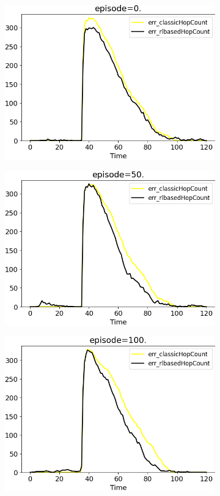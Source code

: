 \documentclass[
  twocolumn,
]{ceurart}
\begin{document}
\begin{figure}
  \centering
  \begin{subfigure}[b]{0.3\textwidth}
      \centering
      \includegraphics[width=\textwidth]{img/1}
  \end{subfigure}
  \hfill
  \begin{subfigure}[b]{0.3\textwidth}
      \centering
      \includegraphics[width=\textwidth]{img/50}
  \end{subfigure}
  \hfill
  \begin{subfigure}[b]{0.3\textwidth}
      \centering
      \includegraphics[width=\textwidth]{img/100}

\end{subfigure}
\end{figure}
\end{document}
